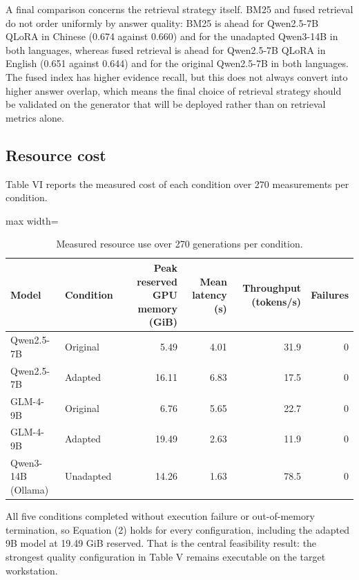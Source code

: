 \documentclass{article}
\begin{document}
A final comparison concerns the retrieval strategy itself. BM25 and fused retrieval do not order uniformly by answer quality: BM25 is ahead for Qwen2.5-7B QLoRA in Chinese (0.674 against 0.660) and for the unadapted Qwen3-14B in both languages, whereas fused retrieval is ahead for Qwen2.5-7B QLoRA in English (0.651 against 0.644) and for the original Qwen2.5-7B in both languages. The fused index has higher evidence recall, but this does not always convert into higher answer overlap, which means the final choice of retrieval strategy should be validated on the generator that will be deployed rather than on retrieval metrics alone.

\subsection{Resource cost}

Table VI reports the measured cost of each condition over 270 measurements per condition.

\begin{table}[ht]
\centering
\caption{Measured resource use over 270 generations per condition.}

\small
\begin{adjustbox}{max width=\linewidth}
\begin{tabular}{llrrrr}
\toprule
Model & Condition & Peak reserved GPU memory (GiB) & Mean latency (s) & Throughput (tokens/s) & Failures \\
\midrule
Qwen2.5-7B & Original & 5.49 & 4.01 & 31.9 & 0 \\
Qwen2.5-7B & Adapted & 16.11 & 6.83 & 17.5 & 0 \\
GLM-4-9B & Original & 6.76 & 5.65 & 22.7 & 0 \\
GLM-4-9B & Adapted & 19.49 & 2.63 & 11.9 & 0 \\
Qwen3-14B (Ollama) & Unadapted & 14.26 & 1.63 & 78.5 & 0 \\
\bottomrule
\end{tabular}
\end{adjustbox}
\end{table}

All five conditions completed without execution failure or out-of-memory termination, so Equation (2) holds for every configuration, including the adapted 9B model at 19.49 GiB reserved. That is the central feasibility result: the strongest quality configuration in Table V remains executable on the target workstation.
\end{document}
